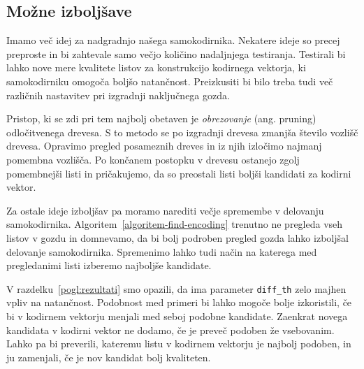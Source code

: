 \documentclass[12pt,a4paper,twoside]{article}
\theoremstyle{definition} %
\theoremstyle{plain} %
\numberwithin{equation}{section}  %
\begin{document}


\subsection{Možne izboljšave}


Imamo več idej za nadgradnjo našega samokodirnika.
Nekatere ideje so precej preproste in bi zahtevale samo večjo količino nadaljnjega testiranja.
Testirali bi lahko nove mere kvalitete listov za konstrukcijo kodirnega vektorja, ki samokodirniku omogoča boljšo natančnost.
Preizkusiti bi bilo treba tudi več različnih nastavitev pri izgradnji naključnega gozda.

Pristop, ki se zdi pri tem najbolj obetaven je \emph{obrezovanje} (ang. pruning) odločitvenega drevesa. %
S to metodo se po izgradnji drevesa zmanjša število vozlišč drevesa.
Opravimo pregled posameznih dreves in iz njih izločimo najmanj pomembna vozlišča.
Po končanem postopku v drevesu ostanejo zgolj pomembnejši listi in pričakujemo, da so preostali listi boljši kandidati za kodirni vektor.

Za ostale ideje izboljšav pa moramo narediti večje spremembe v delovanju samokodirnika.
Algoritem~\ref{algoritem-find-encoding} trenutno ne pregleda vseh listov v gozdu in domnevamo, da bi bolj podroben pregled gozda lahko izboljšal delovanje samokodirnika.
Spremenimo lahko tudi način na katerega med pregledanimi listi izberemo najboljše kandidate.

V razdelku~\ref{pogl:rezultati} smo opazili, da ima parameter \texttt{diff\_th} zelo majhen vpliv na natančnost.
Podobnost med primeri bi lahko mogoče bolje izkoristili, če bi v kodirnem vektorju menjali med seboj podobne kandidate.
Zaenkrat novega kandidata v kodirni vektor ne dodamo, če je preveč podoben že vsebovanim.
Lahko pa bi preverili, kateremu listu v kodirnem vektorju je najbolj podoben, in ju zamenjali, če je nov kandidat bolj kvaliteten.
\end{document}
